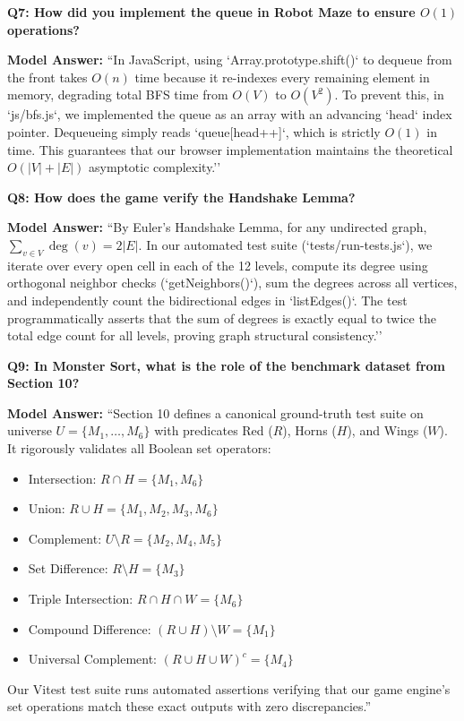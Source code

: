 \documentclass[11pt,a4paper]{article}
\theoremstyle{definition}
\begin{document}
\begin{vivabox}
\textbf{Q7: How did you implement the queue in Robot Maze to ensure $O(1)$ operations?}

\textbf{Model Answer:}
``In JavaScript, using `Array.prototype.shift()` to dequeue from the front takes $O(n)$ time because it re-indexes every remaining element in memory, degrading total BFS time from $O(V)$ to $O(V^2)$. To prevent this, in `js/bfs.js`, we implemented the queue as an array with an advancing `head` index pointer. Dequeueing simply reads `queue[head++]`, which is strictly $O(1)$ in time. This guarantees that our browser implementation maintains the theoretical $O(|V| + |E|)$ asymptotic complexity.''
\end{vivabox}

\begin{vivabox}
\textbf{Q8: How does the game verify the Handshake Lemma?}

\textbf{Model Answer:}
``By Euler's Handshake Lemma, for any undirected graph, $\sum_{v \in V} \operatorname{deg}(v) = 2|E|$. In our automated test suite (`tests/run-tests.js`), we iterate over every open cell in each of the 12 levels, compute its degree using orthogonal neighbor checks (`getNeighbors()`), sum the degrees across all vertices, and independently count the bidirectional edges in `listEdges()`. The test programmatically asserts that the sum of degrees is exactly equal to twice the total edge count for all levels, proving graph structural consistency.''
\end{vivabox}

\begin{vivabox}
\textbf{Q9: In Monster Sort, what is the role of the benchmark dataset from Section 10?}

\textbf{Model Answer:}
``Section 10 defines a canonical ground-truth test suite on universe $U = \{M_1, \dots, M_6\}$ with predicates Red ($R$), Horns ($H$), and Wings ($W$). It rigorously validates all Boolean set operators:
\begin{itemize}
  \item Intersection: $R \cap H = \{M_1, M_6\}$
  \item Union: $R \cup H = \{M_1, M_2, M_3, M_6\}$
  \item Complement: $U \setminus R = \{M_2, M_4, M_5\}$
  \item Set Difference: $R \setminus H = \{M_3\}$
  \item Triple Intersection: $R \cap H \cap W = \{M_6\}$
  \item Compound Difference: $(R \cup H) \setminus W = \{M_1\}$
  \item Universal Complement: $(R \cup H \cup W)^c = \{M_4\}$
\end{itemize}
Our Vitest test suite runs automated assertions verifying that our game engine's set operations match these exact outputs with zero discrepancies.''
\end{vivabox}
\end{document}
